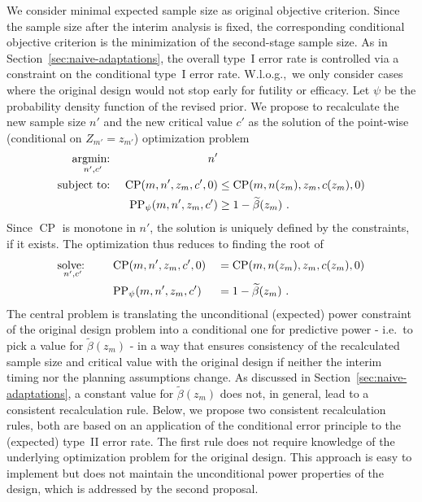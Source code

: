 \documentclass[12pt]{article}
\newcommand{\solve}[1]{\operatornamewithlimits{solve:\ }_{#1}}
\newcommand{\st}{\operatorname{subject\ to:\ }}
\newcommand{\argmin}[1]{\operatornamewithlimits{argmin:\ }_{#1}}
\newcommand{\CP}{\ensuremath{\operatorname{CP}}}
\newcommand{\PP}{\ensuremath{\operatorname{PP}}}
\begin{document}
We consider minimal expected sample size as original objective criterion.
Since the sample size after the interim analysis is fixed,
the corresponding conditional objective criterion is the minimization of the second-stage sample size.
As in Section~\ref{sec:naive-adaptations}, the overall type~I error rate is controlled via a
constraint on the conditional type~I error rate.
W.l.o.g.,~we only consider cases where the original design would not stop early for futility or efficacy.
Let $\psi$ be the probability density function of the revised prior.
We propose to recalculate the new sample size $n'$ and
the new critical value $c'$ as the solution of the point-wise (conditional on $Z_{m'} = z_{m'}$) optimization problem
\begin{align}
    \argmin{n',c'} && n' & \label{eq:objective-original-interim}\\
    \st
    && \CP(m, n', z_{m}, c', 0) &\leq \CP(m, n(z_m), z_{m}, c(z_m), 0) \\
    && \PP_\psi(m, n', z_{m}, c') &\geq 1 - \widetilde{\beta}(z_m) \ . \label{eq:objective-original-interim-end}
\end{align}
Since $\CP$ is monotone in $n'$, the solution is uniquely
defined by the constraints, if it exists.
The optimization thus reduces to finding the root of
\begin{align}
    \solve{n',c'} \qquad
    & \CP(m, n', z_{m}, c', 0) &&= \CP(m, n(z_m), z_{m}, c(z_m), 0) \label{eq:root-cp}\\
    & \PP_\psi(m, n', z_{m}, c') &&= 1 - \widetilde{\beta}(z_m) \ . \label{eq:root-pp}
\end{align}
The central problem is translating the unconditional (expected) power constraint of the
original design problem into a conditional one for predictive power - i.e.~to pick a value for $\widetilde{\beta}(z_m)$ - in a way that ensures consistency of the recalculated sample size and critical value with the original design if neither the interim timing nor the planning assumptions change.
As discussed in Section~\ref{sec:naive-adaptations}, a constant value for $\widetilde{\beta}(z_m)$ does not, in general, lead to a consistent recalculation rule.
Below, we propose two consistent recalculation rules,
both are based on an application of the conditional error principle to the (expected) type~II error rate.
The first rule does not require knowledge of the underlying optimization problem for the original design.
This approach is easy to implement but does not maintain the unconditional power properties of the design, which is addressed by the second proposal.
\end{document}

